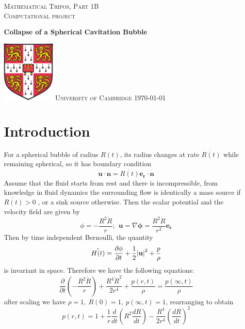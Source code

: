 \documentclass[11pt]{article}
\begin{document}
\begin{titlepage} %
	
	\center %
	
	\vspace*{3cm}

	\textsc{Mathematical Tripos, Part 1B}\\
	\textsc{Computational project}
	\begin{center}
      {\huge\bfseries Collapse of a Spherical Cavitation Bubble\\[0.4cm]
}     \end{center}
	
	\vfill
	\vfill\vfill
	
	\includegraphics*[width = 2.675cm, height = 3.1cm]{coat.png}
	\vfill
	\textsc{University of Cambridge}
	\vspace*{\fill}
	\vfill\vfill
	{\large\today} 
	\vfill
\end{titlepage}

\section{Introduction}
For a spherical bubble of radius $R(t)$, its radius changes at rate $\dot{R(t)}$ while remaining spherical, so it has boundary condition $$\mathbf{u\cdot n}= \dot{R(t)}\mathbf{e_{r} \cdot n}$$ Assume that the fluid starts from rest and there is incompressible, from knowledge in fluid dynamics the surrounding flow is identically a mass source if $\dot{R(t)}>0$ , or a sink source otherwise.
Then the scalar potential and the velocity field are given by $$ \phi =-\frac{R^2\dot{R}}{r};\ \ \mathbf{u} = \nabla\mathbf{\phi} = \frac{R^2\dot{R}}{r^{2}}\mathbf{e_{r}}$$
Then by time independent Bernoulli, the quantity
$$ \tilde{H(t)} = \frac{\partial\phi}{\partial t} + \frac{1}{2}\abs{\mathbf{u}}^2 +\frac{p}{\rho}$$ is invariant in space.
Therefore we have the following equations:$$\frac{\partial}{\partial t}\left(-\frac{R^2\dot{R}}{r}\right)+\frac{R^4 \dot{R}^2}{2r^4}+\frac{p(r,t)}{\rho} = \frac{p(\infty,t)}{\rho}$$
after scaling we have $\rho=1,\ R(0)=1,\ p(\infty, t)=1$, rearranging to obtain \begin{equation}
p(r,t) =1+\frac{1}{r}\frac{d}{dt}\left({R^2\frac{dR}{dt}}\right)-\frac{R^4}{2r^4} \left(\frac{dR}{dt}\right)^2 \tag{1.1}
\end{equation}
\end{document}

